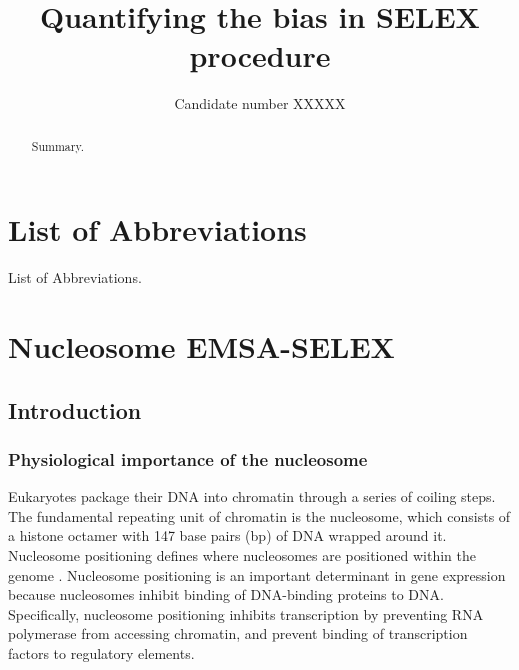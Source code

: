 \documentclass[parskip=full, numbers=noenddot]{scrreprt}
\title{Quantifying the bias in SELEX procedure}
\author{Candidate number XXXXX}
\begin{document}

\maketitle

\begin{abstract}
  
Summary.
 
\end{abstract}

\tableofcontents

\chapter*{List of Abbreviations}
\label{ch:abbrev}

List of Abbreviations.

\chapter{Nucleosome EMSA-SELEX}
\label{ch:emsaselex}

\section{Introduction}
\label{sec:emsaselex_intro}

\subsection{Physiological importance of the nucleosome}
\label{ssec:emsaselex_intro_importance}

Eukaryotes package their DNA into chromatin through a series of coiling steps.  The fundamental repeating unit of chromatin is the nucleosome, which consists of a histone octamer with 147 base pairs (bp) of DNA wrapped around it.  Nucleosome positioning defines where nucleosomes are positioned within the genome \citep{struhl_determinants_2013}.  Nucleosome positioning is an important determinant in gene expression because nucleosomes inhibit binding of DNA-binding proteins to DNA.  Specifically, nucleosome positioning inhibits transcription by preventing RNA polymerase from accessing chromatin, and prevent binding of transcription factors to regulatory elements.
\end{document}
